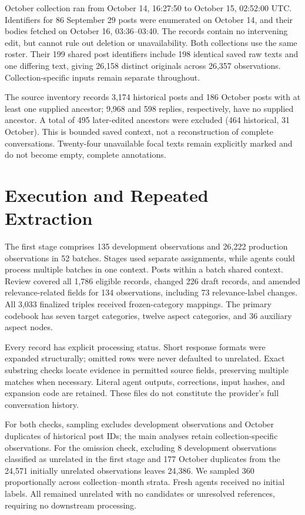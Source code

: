 \documentclass[sigconf,balance=false]{acmart}
\begin{document}
October collection ran from October 14, 16:27:50 to October 15, 02:52:00 UTC. Identifiers for 86 September 29 posts were enumerated on October 14, and their bodies fetched on October 16, 03:36--03:40. The records contain no intervening edit, but cannot rule out deletion or unavailability. Both collections use the same roster. Their 199 shared post identifiers include 198 identical saved raw texts and one differing text, giving 26,158 distinct originals across 26,357 observations. Collection-specific inputs remain separate throughout.

The source inventory records 3,174 historical posts and 186 October posts with at least one supplied ancestor; 9,968 and 598 replies, respectively, have no supplied ancestor. A total of 495 later-edited ancestors were excluded (464 historical, 31 October). This is bounded saved context, not a reconstruction of complete conversations. Twenty-four unavailable focal texts remain explicitly marked and do not become empty, complete annotations.

\section{Execution and Repeated Extraction}\label{app:execution}
The first stage comprises 135 development observations and 26,222 production observations in 52 batches. Stages used separate assignments, while agents could process multiple batches in one context. Posts within a batch shared context. Review covered all 1,786 eligible records, changed 226 draft records, and amended relevance-related fields for 134 observations, including 73 relevance-label changes. All 3,033 finalized triples received frozen-category mappings. The primary codebook has seven target categories, twelve aspect categories, and 36 auxiliary aspect nodes.

Every record has explicit processing status. Short response formats were expanded structurally; omitted rows were never defaulted to unrelated. Exact substring checks locate evidence in permitted source fields, preserving multiple matches when necessary. Literal agent outputs, corrections, input hashes, and expansion code are retained. These files do not constitute the provider's full conversation history.

For both checks, sampling excludes development observations and October duplicates of historical post IDs; the main analyses retain collection-specific observations. For the omission check, excluding 8 development observations classified as unrelated in the first stage and 177 October duplicates from the 24,571 initially unrelated observations leaves 24,386. We sampled 360 proportionally across collection--month strata. Fresh agents received no initial labels. All remained unrelated with no candidates or unresolved references, requiring no downstream processing.
\end{document}
